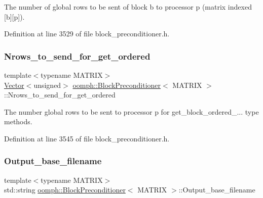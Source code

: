 The number of global rows to be sent of block b to processor p (matrix indexed \mbox{[}b\mbox{]}\mbox{[}p\mbox{]}). 



Definition at line 3529 of file block\+\_\+preconditioner.\+h.

\mbox{\label{classoomph_1_1BlockPreconditioner_ae1a0fcd29c4939f668d2225b5d33caf5}} 
\subsubsection{\texorpdfstring{Nrows\+\_\+to\+\_\+send\+\_\+for\+\_\+get\+\_\+ordered}{Nrows\_to\_send\_for\_get\_ordered}}
{\footnotesize\ttfamily template$<$typename M\+A\+T\+R\+IX$>$ \\
\hyperlink{classoomph_1_1Vector}{Vector}$<$unsigned$>$ \hyperlink{classoomph_1_1BlockPreconditioner}{oomph\+::\+Block\+Preconditioner}$<$ M\+A\+T\+R\+IX $>$\+::Nrows\+\_\+to\+\_\+send\+\_\+for\+\_\+get\+\_\+ordered\hspace{0.3cm}{\ttfamily [private]}}



The number global rows to be sent to processor p for get\+\_\+block\+\_\+ordered\+\_\+... type methods. 



Definition at line 3545 of file block\+\_\+preconditioner.\+h.

\mbox{\label{classoomph_1_1BlockPreconditioner_a915ff2775ccef6ac3dadf072566da9e7}} 
\subsubsection{\texorpdfstring{Output\+\_\+base\+\_\+filename}{Output\_base\_filename}}
{\footnotesize\ttfamily template$<$typename M\+A\+T\+R\+IX$>$ \\
std\+::string \hyperlink{classoomph_1_1BlockPreconditioner}{oomph\+::\+Block\+Preconditioner}$<$ M\+A\+T\+R\+IX $>$\+::Output\+\_\+base\+\_\+filename\hspace{0.3cm}{\ttfamily [private]}}



